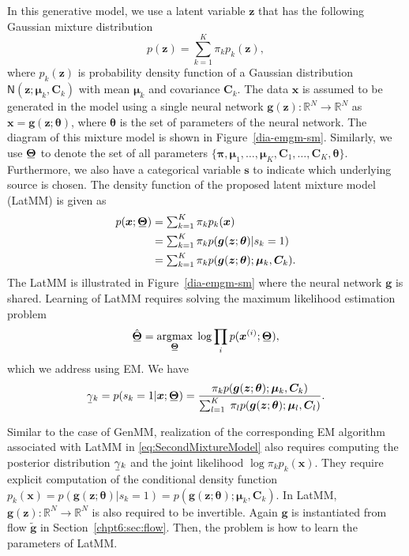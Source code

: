 In this generative model, we use a latent variable $\bm{z}$ that has the following Gaussian mixture distribution
\begin{equation}
  p(\bm{z}) = \sum_{k=1}^K \pi_k p_k(\bm{z}), %
\end{equation}
where $p_k(\bm{z})$ is probability density function of a Gaussian distribution $\mathsf{N}(\bm{z};\bm{\mu}_k,\bm{C}_k)$ with mean $\bm{\mu}_k$ and covariance $\bm{C}_k$.
The data $\bm{x}$ is
assumed to be generated in the model using a single neural network
$\bm{g}(\bm{z}): \mathbb{R}^N \rightarrow \mathbb{R}^N$ as
$\bm{x}=\bm{g}(\bm{z};\bm{\theta})$, where $\bm{\theta}$
is the set of parameters of the neural network. The diagram of this mixture model
is shown in Figure~\ref{dia-emgm-sm}. Similarly, we use $\ubar{\bm{\Theta}}$ to denote the set of all parameters $\{ \bm{\pi},
\bm{\mu}_1,\hdots, \bm{\mu}_K, \bm{C}_1,\hdots,
\bm{C}_K, \bm{\theta} \}$. Furthermore, we also have a categorical variable $\bm{s}$ to indicate which underlying source is chosen. The density function of the proposed latent mixture model (LatMM) is given as
\begin{align}\label{eq:SecondMixtureModel}
  p(\bm{x};\ubar{\bm{\Theta}}) & = \textstyle\sum_{k=1}^K \pi_k p_k(\bm{x}) \nonumber\\
                               &= \textstyle\sum_{k=1}^K \pi_k  p(\bm{g}(\bm{z}; \bm{\theta})| s_k=1) \nonumber \\
                               & = \textstyle\sum_{k=1}^K \pi_k  p(\bm{g}(\bm{z};\bm{\theta}); \bm{\mu}_k, \bm{C}_k).
\end{align}
The LatMM is illustrated in Figure~\ref{dia-emgm-sm} where the neural network $\bm{g}$ is shared. Learning of LatMM requires solving the maximum likelihood estimation problem
\begin{equation}
  \ubar{\hat{\bm{\Theta}}} =    \uargmax{\ubar{\bm{\Theta}}}{} \log \prod_{i} p(\bm{x}^{(i)};\ubar{\bm{\Theta}}),
\end{equation}
which we address using EM.
We have
\begin{align}\label{eq-latMM-gamma}
  \ubar{\gamma}_k = p(s_k =1|\bm{x};\ubar{\bm{\Theta}})  
  = \frac{\pi_k p(\bm{g}(\bm{z};\bm{\theta});\bm{\mu}_k, \bm{C}_k)}{\sum_{l=1}^K\; \pi_l p(\bm{g}(\bm{z};\bm{\theta});\bm{\mu}_l, \bm{C}_l)}.
\end{align}

Similar to the case of GenMM, realization of the corresponding EM
algorithm associated with LatMM in \ref{eq:SecondMixtureModel}
also requires computing the posterior distribution $\ubar{\gamma}_k$ and the joint likelihood $\log{\pi_k p_k(\bm{x})}$. They require explicit computation of the conditional density function $p_k(\bm{x}) = p(\bm{g}(\bm{z};\bm{\theta})| s_k=1) = p(\bm{g}(\bm{z};\bm{\theta});\bm{\mu}_k, \bm{C}_k) $. In LatMM, $\bm{g}(\bm{z}): \mathbb{R}^N \rightarrow \mathbb{R}^N$ is also required to be invertible. Again $\bm{g}$ is instantiated from flow $\tilde{\bm{g}}$ in Section~\ref{chpt6:sec:flow}. Then, the problem is how to learn the parameters of LatMM.

